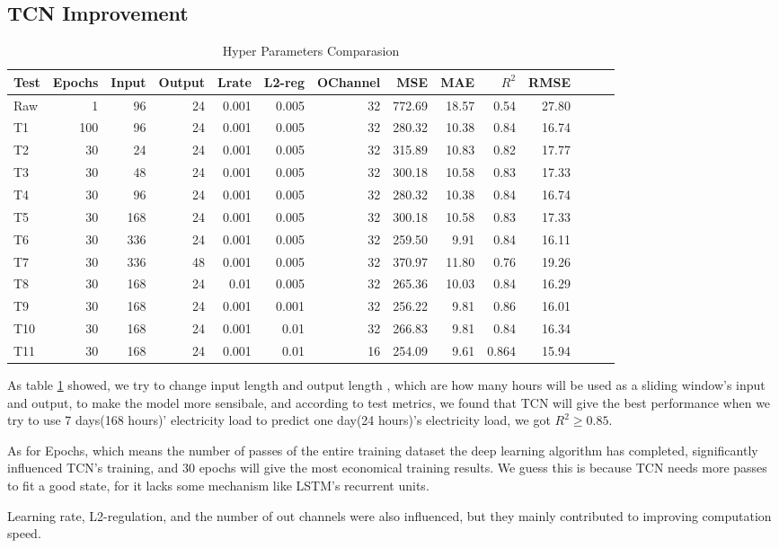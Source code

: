 \subsection{TCN Improvement}
\begin{table}[H]
\centering
\begin{tabular}{l r r r r r r r r r r  r r r}
\toprule
\textbf{Test} & \textbf{Epochs} & \textbf{Input} & \textbf{Output}& \textbf{Lrate} & \textbf{L2-reg} & \textbf{OChannel} & \textbf{MSE} & \textbf{MAE} & \textbf{$R^2$}& \textbf{RMSE} \\
\midrule
Raw & 1& 96& 24& 0.001& 0.005& 32& 772.69& 18.57& 0.54& 27.80\\
T1 & \color{blue}100& 96& 24& 0.001& 0.005& 32& 280.32& 10.38& 0.84& 16.74 \\
T2 & \color{blue}30& 24& 24& 0.001& 0.005& 32& 315.89& 10.83& 0.82& 17.77 \\
T3 & 30& 48& 24& 0.001& 0.005& 32& 300.18& 10.58& 0.83& 17.33 \\
T4 & 30& 96& 24& 0.001& 0.005& 32& 280.32& 10.38& 0.84& 16.74 \\
T5 & 30& \color{blue}168& 24& 0.001& 0.005& 32& 300.18& 10.58& 0.83& 17.33 \\
T6 & 30& 336& 24& 0.001& 0.005& 32& 259.50& 9.91& 0.84& 16.11 \\ %
T7 & 30& 336& \color{blue}48& 0.001& 0.005& 32& 370.97& 11.80& 0.76& 19.26 \\
T8 & 30& 168& 24& \color{blue}0.01& 0.005& 32& 265.36& 10.03& 0.84& 16.29 \\
T9 & 30& 168& 24& 0.001& \color{blue}0.001& 32& 256.22& 9.81& 0.86& 16.01 \\
T10 & 30& 168& 24& 0.001& \color{blue}0.01& 32& 266.83& 9.81& 0.84& 16.34 \\
T11 & 30& 168& 24& 0.001& 0.01& \color{blue}16& 254.09& 9.61& \color{red}0.864& 15.94 \\
\bottomrule
\end{tabular}
\caption{Hyper Parameters Comparasion}
\label{tab:hyper}
\end{table}

As table \ref{tab:hyper} showed, we try to change input length and output length , which are how many hours will be used as a sliding window's input and output, to make the model more sensibale, and according to test metrics, we found that TCN will give the best performance when we try to use 7 days(168 hours)' electricity load to predict one day(24 hours)'s electricity load, we got $R^2 \geq 0.85$.

As for Epochs, which means the number of passes of the entire training dataset the deep learning algorithm has completed, significantly influenced TCN's training, and 30 epochs will give the most economical training results. We guess this is because TCN needs more passes to fit a good state, for it lacks some mechanism like LSTM's recurrent units.

Learning rate, L2-regulation, and the number of out channels were also influenced, but they mainly contributed to improving computation speed.


